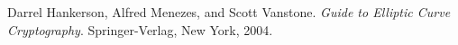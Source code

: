 \begin{thebibliography}{99}


Darrel Hankerson, Alfred Menezes, and Scott Vanstone.
\newblock \emph{Guide to Elliptic Curve Cryptography}.
\newblock Springer-Verlag, New York, 2004.

\end{thebibliography}
